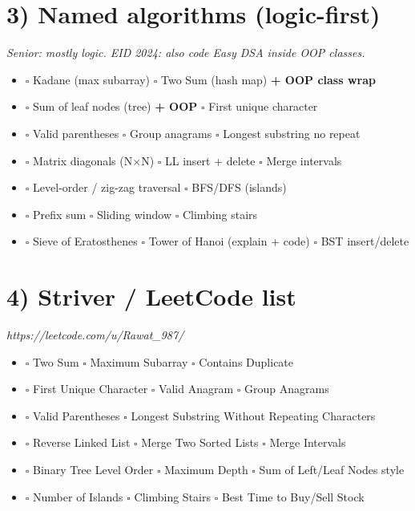 \documentclass[a4paper,9pt]{extarticle}
\newcommand{\tag}[1]{\textcolor{muted}{\small\textit{#1}}}
\begin{document}
\section{3) Named algorithms (logic-first)}
\tag{Senior: mostly logic. EID 2024: also code Easy DSA inside OOP classes.}
\begin{itemize}
  \item $\square$ Kadane (max subarray) \quad $\square$ Two Sum (hash map) \textbf{+ OOP class wrap}
  \item $\square$ Sum of leaf nodes (tree) \textbf{+ OOP} \quad $\square$ First unique character
  \item $\square$ Valid parentheses \quad $\square$ Group anagrams \quad $\square$ Longest substring no repeat
  \item $\square$ Matrix diagonals (N$\times$N) \quad $\square$ LL insert + delete \quad $\square$ Merge intervals
  \item $\square$ Level-order / zig-zag traversal \quad $\square$ BFS/DFS (islands)
  \item $\square$ Prefix sum \quad $\square$ Sliding window \quad $\square$ Climbing stairs
  \item $\square$ Sieve of Eratosthenes \quad $\square$ Tower of Hanoi (explain + code) \quad $\square$ BST insert/delete
\end{itemize}

\section{4) Striver / LeetCode list}
\tag{https://leetcode.com/u/Rawat\_987/}
\begin{itemize}
  \item $\square$ Two Sum \quad $\square$ Maximum Subarray \quad $\square$ Contains Duplicate
  \item $\square$ First Unique Character \quad $\square$ Valid Anagram \quad $\square$ Group Anagrams
  \item $\square$ Valid Parentheses \quad $\square$ Longest Substring Without Repeating Characters
  \item $\square$ Reverse Linked List \quad $\square$ Merge Two Sorted Lists \quad $\square$ Merge Intervals
  \item $\square$ Binary Tree Level Order \quad $\square$ Maximum Depth \quad $\square$ Sum of Left/Leaf Nodes style
  \item $\square$ Number of Islands \quad $\square$ Climbing Stairs \quad $\square$ Best Time to Buy/Sell Stock
\end{itemize}
\end{document}
